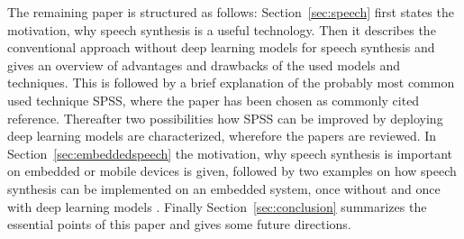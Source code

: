 The remaining paper is structured as follows: Section~\ref{sec:speech} first states the motivation, why speech synthesis is a useful technology. Then it describes the conventional approach without deep learning models for speech synthesis and gives an overview of advantages and drawbacks of the used models and techniques. This is followed by a brief explanation of the probably most common used technique \ac{SPSS}, where the paper \cite{black:statistical} has been chosen as commonly cited reference. Thereafter two possibilities how \ac{SPSS} can be improved by deploying deep learning models are characterized, wherefore the papers \cite{zen:deepstatistical, hashimoto:effect} are reviewed. In Section~\ref{sec:embeddedspeech} the motivation, why speech synthesis is important on embedded or mobile devices is given, followed by two examples on how speech synthesis can be implemented on an embedded system, once without \cite{toth:optimizing} and once with deep learning models \cite{boros:robust}. Finally Section~\ref{sec:conclusion} summarizes the essential points of this paper and gives some future directions.